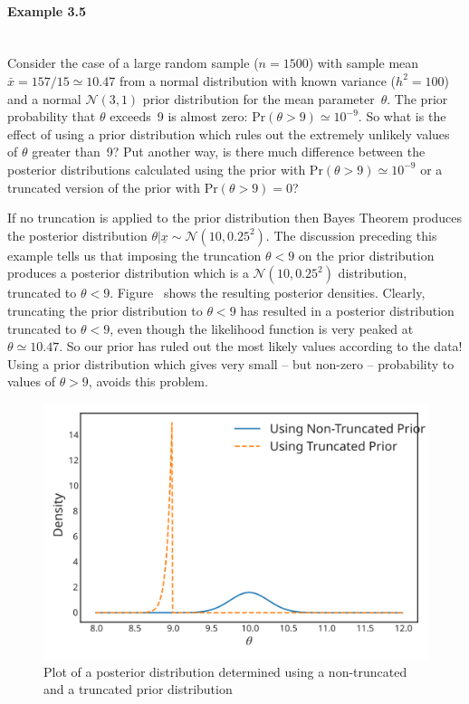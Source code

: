 \paragraph{Example 3.5}{~\\
Consider the case of a large random sample ($n=1500$) with sample mean
$\bar x=157/15\simeq 10.47$ from a normal distribution with known
variance ($h^2=100$) and a normal $\mathcal{N}(3,1)$ prior distribution for the
mean parameter~$\theta$. The prior probability that $\theta$ exceeds~9
is almost zero: $\text{Pr}(\theta>9)\simeq 10^{-9}$. So what is the effect of
using a prior distribution which rules out the extremely unlikely
values of $\theta$ greater than~9? Put another way, is there much
difference between the posterior distributions calculated using the
prior with $\text{Pr}(\theta>9)\simeq 10^{-9}$ or a truncated version of the
prior with $\text{Pr}(\theta>9)=0$?

If no truncation is applied to the prior distribution then Bayes
Theorem produces the posterior distribution $\theta|\underline{x}\sim \mathcal{N}(10,0.25^2)$. The discussion preceding this example tells us that imposing the truncation $\theta<9$ on the prior distribution produces a posterior distribution which is a $\mathcal{N}(10,0.25^2)$ distribution, truncated to $\theta<9$.  Figure~ shows the resulting posterior densities. Clearly, truncating the prior distribution to $\theta<9$ has resulted in a posterior distribution truncated to $\theta<9$, even though the likelihood function is very peaked at $\theta\simeq 10.47$. So our prior has ruled out the most likely values according to the data! Using a prior distribution which gives very small -- but non-zero -- probability to values of $\theta>9$, avoids this problem.
\begin{figure}[h!]

\includegraphics{images/truncposterior2.svg}
\caption{Plot of a posterior distribution determined using a
non-truncated and a truncated prior distribution}


\end{figure}}

